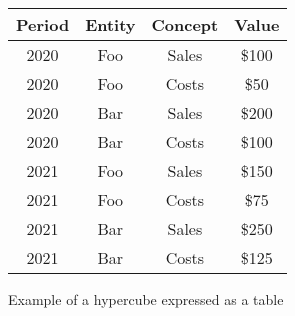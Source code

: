 
\begin{figure}[H]
    \centering
    \begin{tabular}{|c|c|c|c|}
        \hline
        Period & Entity & Concept & Value \\
        \hline
        2020 & Foo & Sales & \$100 \\
        \hline
        2020 & Foo & Costs & \$50 \\
        \hline
        2020 & Bar & Sales & \$200 \\
        \hline
        2020 & Bar & Costs & \$100 \\
        \hline
        2021 & Foo & Sales & \$150 \\
        \hline
        2021 & Foo & Costs & \$75 \\
        \hline
        2021 & Bar & Sales & \$250 \\
        \hline
        2021 & Bar & Costs & \$125 \\
        \hline
    \end{tabular}
    \caption{Example of a hypercube expressed as a table}
    \label{fig:example_hypercube}
\end{figure}


